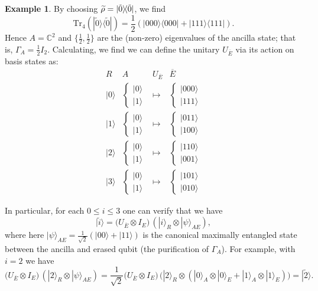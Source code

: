 \documentclass[11pt]{amsart}
\theoremstyle{definition}
\newtheorem{example}[thm]{Example}
\theoremstyle{definition}
\theoremstyle{definition}
\newcommand{\tr}{\textrm{Tr}}
\newcommand{\1}{\mathbb{I}}
\def\ket#1{| #1 \rangle}
\def\kb#1#2{|#1\rangle\!\langle #2 |}
\begin{document}
\begin{example}
By choosing $\widetilde{\rho} = \kb{\Tilde{0}}{\Tilde{0}}$, we find 
\[
\tr_4 ( \kb{\tilde{0}}{\tilde{0}} ) = \frac12 ( \kb{000}{000} + \kb{111}{111}  ).
\]
Hence $A = \mathbb C^2$ and $\{ \frac12 , \frac12 \}$ are the (non-zero) eigenvalues of the ancilla state; that is, $\Gamma_A = \frac12 I_2$. 
Calculating, we find we can define the unitary $U_{\overline{E}}$ via its action on basis states as: 
\[
\begin{array}{cccc} 
R & A & U_{\overline{E}}  & \overline{E}  \\ \hline 
\ket{0} & \left\{ \begin{array}{l}  \ket{0} \\ \ket{1}  \end{array} \right. & \longmapsto & \left\{ \begin{array}{l}  \ket{000} \\ \ket{111}  \end{array} \right. \\ 
\ket{1} & \left\{ \begin{array}{l}  \ket{0} \\ \ket{1}  \end{array} \right. & \longmapsto & \left\{ \begin{array}{l}  \ket{011} \\ \ket{100}  \end{array} \right. \\  
\ket{2} & \left\{ \begin{array}{l}  \ket{0} \\ \ket{1}  \end{array} \right. & \longmapsto & \left\{ \begin{array}{l}  \ket{110} \\ \ket{001}  \end{array} \right. \\  
\ket{3} & \left\{ \begin{array}{l}  \ket{0} \\ \ket{1}  \end{array} \right. & \longmapsto & \left\{ \begin{array}{l}  \ket{101} \\ \ket{010}  \end{array} \right. 
\end{array} 
\]

In particular, for each $0 \leq i \leq 3$ one can verify that we have 
\[
  \ket{\widetilde{i}} = \big( U_{\overline{E}} \otimes I_E \big) \, ( \ket{i}_R \otimes \ket{\psi}_{A E}),  
\]
where here $\ket{\psi}_{AE} = \frac{1}{\sqrt{2}} (\ket{00} + \ket{11})$ is the canonical maximally entangled state between the ancilla and erased qubit (the purification of $\Gamma_A$). For example, with $i=2$ we have 
\[
 \big( U_{\overline{E}} \otimes I_E \big) \, ( \ket{2}_R \otimes \ket{\psi}_{A E}) = \frac{1}{\sqrt{2}} \big( U_{\overline{E}} \otimes I_E \big) \, \big( \ket{2}_R \otimes   ( \ket{0}_A \otimes \ket{0}_E +  \ket{1}_A \otimes \ket{1}_E ) \big) =   \ket{\widetilde{2}} .   
\]


\end{example}
\end{document}
